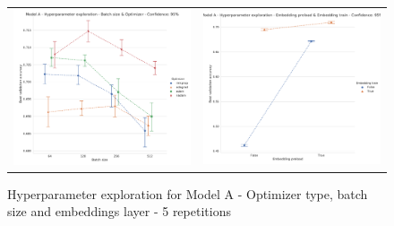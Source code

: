 \documentclass[10pt,journal,compsoc, onecolumn]{IEEEtran}
\begin{document}
\begin{figure}[h]
\begin{tabular}{c c}
    \includegraphics[width=.497\linewidth]{images/chart_09.pdf} &
    \includegraphics[width=.503\linewidth]{images/chart_12.pdf} \\
\end{tabular}
\caption{Hyperparameter exploration for Model A - Optimizer type, batch size and embeddings layer - 5 repetitions}
\label{fig:explorationphase0}
\end{figure}
\end{document}
